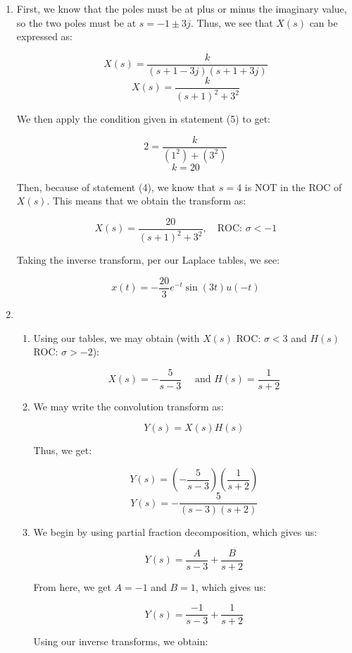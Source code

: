 \begin{enumerate}
  \item

    First, we know that the poles must be at plus or minus the imaginary value, so the two poles must be at $s=-1\pm 3j$. Thus, we see that $X(s)$ can be expressed as:

    $$X(s)=\frac{k}{(s+1-3j)(s+1+3j)}$$
    $$X(s)=\frac{k}{(s+1)^2+3^2}$$

    We then apply the condition given in statement (5) to get:

    $$2=\frac{k}{(1^2)+(3^2)}$$
    $$k=20$$

    Then, because of statement (4), we know that $s=4$ is NOT in the ROC of $X(s)$. This means that we obtain the transform as:

    $$\boxed{X(s)=\frac{20}{(s+1)^2+3^2},\quad\text{ROC: }\sigma <-1}$$

    Taking the inverse transform, per our Laplace tables, we see:

    $$\boxed{x(t)=-\frac{20}{3}e^{-t}\sin(3t)u(-t)}$$

  \item

    \begin{enumerate}

      \item 

        Using our tables, we may obtain (with $X(s)$ ROC: $\sigma <3$ and $H(s)$ ROC: $\sigma>-2$):

        $$\boxed{X(s)=-\frac{5}{s-3}\quad\text{ and }H(s)=\frac{1}{s+2}}$$

      \item 

        We may write the convolution transform as:

        $$Y(s)=X(s)H(s)$$

        Thus, we get:

        $$Y(s)=\left( -\frac{5}{s-3} \right)\left( \frac{1}{s+2} \right)$$
        $$\boxed{Y(s)=-\frac{5}{(s-3)(s+2)}}$$

      \item 

        We begin by using partial fraction decomposition, which gives us:

        $$Y(s)=\frac{A}{s-3}+\frac{B}{s+2}$$

        From here, we get $A=-1$ and $B=1$, which gives us:

        $$Y(s)=\frac{-1}{s-3}+\frac{1}{s+2}$$

        Using our inverse transforms, we obtain:


\end{enumerate}
\end{enumerate}
